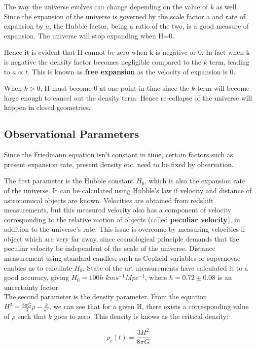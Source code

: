 The way the universe evolves can change depending on the value of $k$ as well. Since the expansion of the universe is governed by the scale factor a and rate of expansion by $\dot{a}$, the Hubble factor, being a ratio of the two, is a good measure of expansion. The universe will stop expanding when H=0. 

Hence it is evident that H cannot be zero when k is negative or 0. In fact when k is negative the density factor becomes negligible compared to the $k$ term, leading to $a \propto t$. This is known as \textbf{free expansion} as the velocity of expansion is 0.

When $k>0$, H must become 0 at one point in time since the $k$ term will become large enough to cancel out the density term. Hence re-collapse of the universe will happen in closed geometries.

\subsection{Observational Parameters}
Since the Friedmann equation isn't constant in time, certain factors such as present expansion rate, present density etc. need to be fixed by observation. 

The first parameter is the Hubble constant $H_0$, which is also the expansion rate of the universe. It can be calculated using Hubble's law if velocity and distance of astronomical objects are known. Velocities are obtained from redshift measurements, but this measured velocity also has a component of velocity corresponding to the relative motion of objects (called \textbf{peculiar velocity}), in addition to the universe's rate. This issue is overcome by measuring velocities if object which are very far away, since cosmological principle demands that the peculiar velocity be independent of the scale of the universe. Distance measurement using standard candles, such as Cepheid variables or supernovae enables us to calculate $H_0$. State of the art measurements have calculated it to a good accuracy, giving $H_0=100h$ $kms^{-1} Mpc^{-1}$, where $h=0.72\pm0.08$ is an uncertainty factor. \\

The second parameter is the density parameter. From the equation $H^2 = \frac{8{\pi}G}{3}\rho - \frac{k}{a^2}$, we can see that for a given H, there exists a corresponding value of $\rho$ such that $k$ goes to zero. This density is knows as the critical density:

\begin{equation}
    \rho_{c}(t) = \frac{3H^2}{8{\pi}G}
\end{equation}

